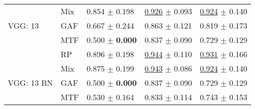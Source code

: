 \begin{tabular}[t]{lllll}
 & Mix & \textcolor[rgb]{0.1175422974,0.5000000000,0}{0.854} $\pm$ \textcolor[rgb]{0.7578007605,0.2421992395,0}{0.198} & \underline{\textcolor[rgb]{0.1707317073,0.5000000000,0}{0.926}} $\pm$ \textcolor[rgb]{0.2602523331,0.5000000000,0}{0.093} & \underline{\textcolor[rgb]{0.1794871795,0.5000000000,0}{0.924}} $\pm$ \textcolor[rgb]{0.2698456329,0.5000000000,0}{0.140} \\
VGG: 13 & GAF & \textcolor[rgb]{0.5583259127,0.4416740873,0}{0.667} $\pm$ \textcolor[rgb]{0.9341807785,0.0658192215,0}{0.244} & \textcolor[rgb]{0.4918699187,0.5000000000,0}{0.863} $\pm$ \textcolor[rgb]{0.4337722642,0.5000000000,0}{0.121} & \textcolor[rgb]{0.5641025641,0.4358974359,0}{0.819} $\pm$ \textcolor[rgb]{0.4793875881,0.5000000000,0}{0.173} \\
 & MTF & \textcolor[rgb]{0.9501335708,0.0498664292,0}{0.500} $\pm$ \textbf{\textcolor[rgb]{0.0000000000,0.5000000000,0}{0.000}} & \textcolor[rgb]{0.6260162602,0.3739837398,0}{0.837} $\pm$ \textcolor[rgb]{0.2377009274,0.5000000000,0}{0.090} & \textcolor[rgb]{0.8974358974,0.1025641026,0}{0.729} $\pm$ \textcolor[rgb]{0.2017357855,0.5000000000,0}{0.129} \\
 & RP & \textcolor[rgb]{0.0195903829,0.5000000000,0}{0.896} $\pm$ \textcolor[rgb]{0.7578007605,0.2421992395,0}{0.198} & \underline{\textcolor[rgb]{0.0813008130,0.5000000000,0}{0.944}} $\pm$ \textcolor[rgb]{0.3672244725,0.5000000000,0}{0.110} & \underline{\textcolor[rgb]{0.1538461538,0.5000000000,0}{0.931}} $\pm$ \textcolor[rgb]{0.4332280526,0.5000000000,0}{0.166} \\
 & Mix & \textcolor[rgb]{0.0685663402,0.5000000000,0}{0.875} $\pm$ \textcolor[rgb]{0.7623521573,0.2376478427,0}{0.199} & \underline{\textcolor[rgb]{0.0853658537,0.5000000000,0}{0.943}} $\pm$ \textcolor[rgb]{0.2161475738,0.5000000000,0}{0.086} & \underline{\textcolor[rgb]{0.1794871795,0.5000000000,0}{0.924}} $\pm$ \textcolor[rgb]{0.2698456329,0.5000000000,0}{0.140} \\
VGG: 13 BN & GAF & \textcolor[rgb]{0.9501335708,0.0498664292,0}{0.500} $\pm$ \textbf{\textcolor[rgb]{0.0000000000,0.5000000000,0}{0.000}} & \textcolor[rgb]{0.6260162602,0.3739837398,0}{0.837} $\pm$ \textcolor[rgb]{0.2377009274,0.5000000000,0}{0.090} & \textcolor[rgb]{0.8974358974,0.1025641026,0}{0.729} $\pm$ \textcolor[rgb]{0.2017357855,0.5000000000,0}{0.129} \\
 & MTF & \textcolor[rgb]{0.8788958148,0.1211041852,0}{0.530} $\pm$ \textcolor[rgb]{0.6254149914,0.3745850086,0}{0.164} & \textcolor[rgb]{0.6463414634,0.3536585366,0}{0.833} $\pm$ \textcolor[rgb]{0.3913485406,0.5000000000,0}{0.114} & \textcolor[rgb]{0.8461538462,0.1538461538,0}{0.743} $\pm$ \textcolor[rgb]{0.3502477607,0.5000000000,0}{0.153} \\

\end{tabular}
